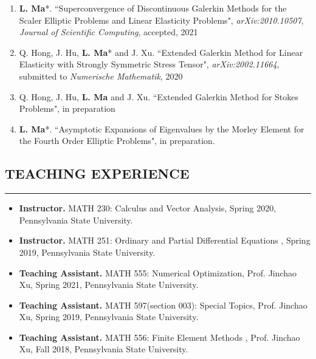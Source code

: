 \documentclass[10pt,a4]{article}
\begin{document}
\begin{small}
\begin{enumerate}
	\item \textbf{L. Ma}*. ``Superconvergence of Discontinuous Galerkin Methods for the Scaler Elliptic Problems and Linear Elasticity Problems", {\it arXiv:2010.10507}, {\it Journal of Scientific Computing}, accepted, 2021

	\item Q. Hong, J. Hu, \textbf{L. Ma}* and J. Xu. ``Extended Galerkin Method for Linear Elasticity with Strongly Symmetric Stress Tensor", {\it arXiv:2002.11664}, submitted to   {\it Numerische Mathematik}, 2020
	
	
	\item Q. Hong, J. Hu, \textbf{L. Ma} and J. Xu. ``Extended Galerkin Method for Stokes Problems", in preparation
	
	\item \textbf{L. Ma}*. ``Asymptotic Expansions of Eigenvalues by the Morley Element for the Fourth Order Elliptic Problems", in preparation.
    
\end{enumerate}

\subsection*{TEACHING EXPERIENCE}
\hrule
\vspace{0.2cm}

\begin{itemize}

\item {\bf Instructor.} MATH 230:  Calculus and Vector Analysis, Spring 2020, Pennsylvania State University. 

\item {\bf Instructor.} MATH 251: Ordinary and Partial Differential Equations , Spring 2019, Pennsylvania State University.

\item {\bf Teaching Assistant.} MATH 555: Numerical Optimization, Prof. Jinchao Xu, Spring 2021, Pennsylvania State University.

\item {\bf Teaching Assistant.} MATH 597(section 003): Special Topics, Prof. Jinchao Xu, Spring 2019, Pennsylvania State University.

\item {\bf Teaching Assistant.} MATH 556: Finite Element Methods , Prof. Jinchao Xu, Fall 2018, Pennsylvania State University.

\end{itemize}

\end{small}
\end{document}

